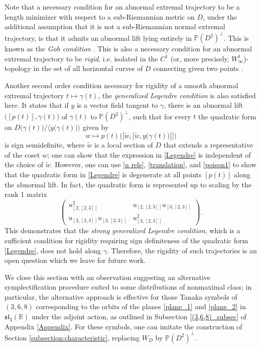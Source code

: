 \documentclass[11pt,letterpaper]{amsart}
\numberwithin{equation}{section}
\begin{document}
Note that a necessary condition for an abnormal extremal trajectory to be a length minimizer with respect to a sub-Riemannian metric on $D$, under the additional assumption that it is not a sub-Riemannian normal extremal trajectory,  is that it admits an abnormal lift lying entirely in $\mathbb{P}(D^2)^\perp$. This is known as the \emph{Goh condition} \cite{Agrachev-Sarychev}. This is also a necessary condition for an abnormal extremal trajectory  to be \emph{rigid}, i.e. isolated in the $C^1$ (or, more precisely,  $W^1_\infty$)-topology in the set of all horizontal curves of $D$ connecting given two points \cite{Agrachev-Sarychev, Bryant_Hsu, zel99}. 

Another second order condition necessary for rigidity of a smooth abnormal extremal trajectory $t\mapsto \gamma(t)$, the \emph{generalized Legendre condition} is also satisfied here. 
It states that if $y$ is a vector field tangent to $\gamma$, there is an abnormal lift   $\big([p(t)], \gamma(t)\big)$ of $\gamma(t)$ to $\mathbb P (D^2)^\perp$, such that for every $t$ the quadratic form on $D\big(\gamma(t)\big)/\big\langle y\big(\gamma(t)\big)\big\rangle$ given by 
 \begin{equation}
 \label{Legendre}
     w\mapsto p(t) \Big(\Big[\widetilde w, \big[\widetilde w, y\big(\gamma(t)\big)\big]\Big]\Big)
 \end{equation}    
     is sign semidefinite, where $\widetilde w$ is a local section of $D$ that extends a representative of the coset $w$; one can show that the expression in \eqref{Legendre} is independent of the choice of $\widetilde w$. However, one can use \eqref{n rels}, \eqref{translation}, and \eqref{poison1} to show that the quadratic form in \eqref{Legendre} is degenerate at all points $[p(t)]$ along the abnormal lift. In fact, the quadratic form is represented up to scaling by the rank 1 matrix 
     \[
     \begin{pmatrix}
         u_{[2,[2,3]]}^2 & u_{[2,[2,3]]}u_{[3,[2,3]]}\\
         u_{[2,[2,3]]}u_{[3,[2,3]]}&u_{[3,[2,3]]}^2
     \end{pmatrix}.
     \]
This demonstrates that the \textit{strong generalized Legendre condition}, which is a sufficient condition for rigidity requiring sign definiteness of the quadratic form \eqref{Legendre}, does not hold along $\gamma$. Therefore, the rigidity of such trajectories is an open question which we leave for future work.

We close this section with an observation suggesting an alternative symplectification procedure suited to some distributions of nonmaximal class; in particular, the alternative approach is effective for those Tanaka symbols of $(3,6,8)$ corresponding to the orbits of the planes \eqref{plane_1} and \eqref{plane_2} in $\mathfrak {sl}_3(\mathbb R)$ under the adjoint action, as outlined in Subsection \ref{(3,6,8)_subsec} of Appendix \ref{Appendix}. For these symbols, one can imitate the construction of Section \ref{subsection:characteristic}, replacing $W_D$ by $\mathbb P(D^2)^\perp$. 
\end{document}
